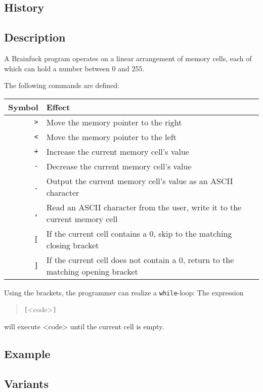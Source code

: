 \subsection{History}

\blindtext

\subsection{Description}

A Brainfuck program operates on a linear arrangement of memory cells, each of which can hold a number between 0 and 255.

The following commands are defined:

\begin{tabular}{r|l}
    Symbol & Effect\\
    \hline
    \texttt{>} & Move the memory pointer to the right\\
    \texttt{<} & Move the memory pointer to the left\\
    \texttt{+} & Increase the current memory cell's value\\
    \texttt{-} & Decrease the current memory cell's value\\
    \texttt{.} & Output the current memory cell's value as an ASCII character\\
    \texttt{,} & Read an ASCII character from the user, write it to the current memory cell\\
    \texttt{[} & If the current cell contains a 0, skip to the matching closing bracket\\
    \texttt{]} & If the current cell does not contain a 0, return to the matching opening bracket\\
\end{tabular}

Using the brackets, the programmer can realize a \texttt{while}-loop: The expression

\begin{quotation}
    \texttt{[}<code>\texttt{]}
\end{quotation}

will execute <code> until the current cell is empty.

\subsection{Example}



\blindtext

\subsection{Variants}

\blindtext
